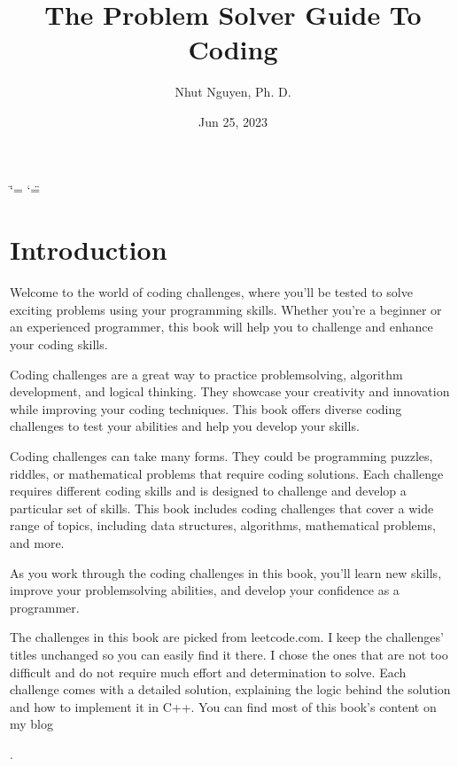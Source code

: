 \documentclass[letterpaper,12pt,english]{book}
\title{The Problem Solver Guide To Coding}
\date{Jun 25, 2023}
\author{Nhut Nguyen, Ph. D.}
\begin{document}
\ifdefined\shorthandoff
  \ifnum\catcode`\=\string=\active\shorthandoff{=}\fi
  \ifnum\catcode`\"=\active{}\fi
\fi

\pagestyle{empty}
\sphinxmaketitle
\pagestyle{plain}
\sphinxtableofcontents
\pagestyle{normal}
\label{\detokenize{index::doc}}


\sphinxstepscope


\chapter{Introduction}
\label{\detokenize{intro:introduction}}\label{\detokenize{intro::doc}}
\sphinxAtStartPar
Welcome to the world of coding challenges, where you’ll be tested to solve exciting problems using your programming skills. Whether you’re a beginner or an experienced programmer, this book will help you to challenge and enhance your coding skills.

\sphinxAtStartPar
Coding challenges are a great way to practice problem\sphinxhyphen{}solving, algorithm development, and logical thinking. They showcase your creativity and innovation while improving your coding techniques. This book offers diverse coding challenges to test your abilities and help you develop your skills.

\sphinxAtStartPar
Coding challenges can take many forms. They could be programming puzzles, riddles, or mathematical problems that require coding solutions. Each challenge requires different coding skills and is designed to challenge and develop a particular set of skills. This book includes coding challenges that cover a wide range of topics, including data structures, algorithms, mathematical problems, and more.

\sphinxAtStartPar
As you work through the coding challenges in this book, you’ll learn new skills, improve your problem\sphinxhyphen{}solving abilities, and develop your confidence as a programmer.

\sphinxAtStartPar
The challenges in this book are picked from leetcode.com. I keep the challenges’ titles unchanged so you can easily find it there. I chose the ones that are not too difficult and do not require much effort and determination to solve. Each challenge comes with a detailed solution, explaining the logic behind the solution and how to implement it in C++. You can find most of this book’s content on my blog %
\begin{footnote}[1]\sphinxAtStartFootnote
{}
%
\end{footnote}.
\end{document}
